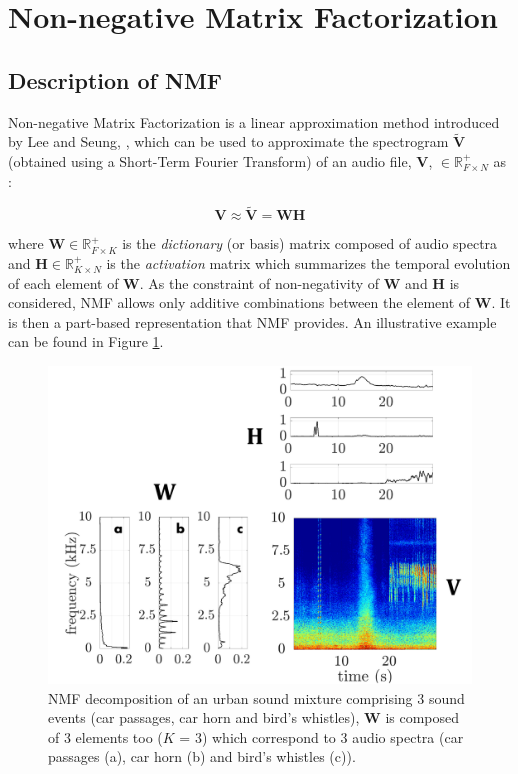 \documentclass[twocolumn]{svjour3}          %
\begin{document}
\section{Non-negative Matrix Factorization}\label{part:nmf}
\subsection{Description of NMF}

Non-negative Matrix Factorization is a linear approximation method introduced by Lee and Seung, \cite{lee_learning_1999}, which can be used to approximate the spectrogram $\mathbf{\tilde{V}}$ (obtained using a Short-Term Fourier Transform) of an audio file, $\mathbf{V}$, $\in \mathbb{R}^+_{F \times N}$ as :

\begin{equation}\label{eq:nmf}
\mathbf{V} \approx \mathbf{\tilde{V}} = \mathbf{WH}
\end{equation}

where $\mathbf{W} \in \mathbb{R}^+_{F \times K}$ is the \textit{dictionary} (or basis) matrix composed of audio spectra and $\mathbf{H} \in \mathbb{R}^+_{K \times N}$ is the \textit{activation} matrix which summarizes the temporal evolution of each element of $\mathbf{W}$. As the constraint of non-negativity of $\mathbf{W}$ and $\mathbf{H}$ is considered, NMF allows only additive combinations between the element of $\mathbf{W}$. It is then a part-based representation that NMF provides. An illustrative example can be found in Figure \ref{fig:example_NMF}.

\begin{figure}[t]
\centering
\includegraphics[width=0.9\linewidth]{figures/schema_introduction_nmf.pdf}
\caption{NMF decomposition of an urban sound mixture comprising 3 sound events (car passages, car horn and bird's whistles), $\mathbf{W}$ is composed of 3 elements too ($K$ = 3) which correspond to 3 audio spectra (car passages (a), car horn (b) and bird's whistles (c)).}
\label{fig:example_NMF}
\end{figure}
\end{document}

